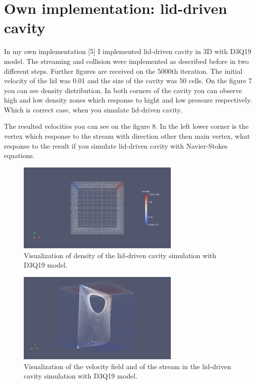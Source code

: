 
\section{Own implementation: lid-driven cavity}

In my own implementation [5] I implemented lid-driven cavity in 3D with D3Q19 model. The streaming and collision were implemented as described before in two different steps. Further figures are received on the 5000th iteration. The initial velocity of the lid was 0.01 and the size of the cavity was 50 cells. On the figure 7 you can see density distribution. In both corners of the cavity you can observe high and low density zones which response to hight and low pressure respectively. Which is correct case, when you simulate lid-driven cavity.

The resulted velocities you can see on the figure 8. In the left lower corner is the vertex which response to the stream with direction other then main vertex, what response to the result if you simulate lid-driven cavity with Navier-Stokes equations.

\begin{figure}[H]
  \centering
  \includegraphics[width=0.7\textwidth]{img/fig10.png}
  \caption{Visualization of density of the lid-driven cavity simulation with D3Q19 model.}
\end{figure}

\begin{figure}[H]
  \centering
  \includegraphics[width=0.7\textwidth]{img/fig11.png}
  \caption{Visualization of the velocity field and of the stream in the lid-driven cavity simulation with D3Q19 model.}
\end{figure}